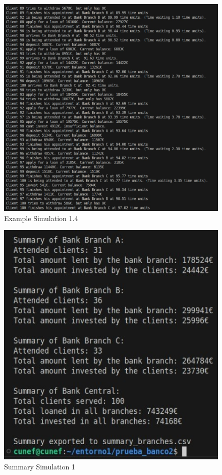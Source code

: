 \documentclass[titlepage, 12pt]{article}
\begin{document}
\begin{figure} [h]
    \centering
    \includegraphics[scale=0.6]{Screenshots/Example Simulation 1.4.jpeg}
    \caption{Example Simulation 1.4}
    \label{fig:Example Simulation 1.4}
\end{figure}

\begin{figure} [h]
    \centering
    \includegraphics[scale=1]{Screenshots/Summary Simulation 1.jpeg}
    \caption{Summary Simulation 1}
    \label{fig:Summary Simulation 1}
\end{figure}
\end{document}
